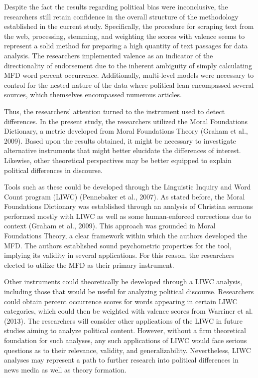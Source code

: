 \documentclass[english,,man]{apa6}
\begin{document}
Despite the fact the results regarding political bias were inconclusive, the researchers still retain confidence in the overall structure of the methodology established in the current study. Specifically, the procedure for scraping text from the web, processing, stemming, and weighting the scores with valence seems to represent a solid method for preparing a high quantity of text passages for data analysis. The researchers implemented valence as an indicator of the directionality of endorsement due to the inherent ambiguity of simply calculating MFD word percent occurrence. Additionally, multi-level models were necessary to control for the nested nature of the data where political lean encompassed several sources, which themselves encompassed numerous articles.

Thus, the researchers' attention turned to the instrument used to detect differences. In the present study, the researchers utilized the Moral Foundations Dictionary, a metric developed from Moral Foundations Theory (Graham et al., 2009). Based upon the results obtained, it might be necessary to investigate alternative instruments that might better elucidate the differences of interest. Likewise, other theoretical perspectives may be better equipped to explain political differences in discourse.

Tools such as these could be developed through the Linguistic Inquiry and Word Count program (LIWC) (Pennebaker et al., 2007). As stated before, the Moral Foundations Dictionary was established through an analysis of Christian sermons performed mostly with LIWC as well as some human-enforced corrections due to context (Graham et al., 2009). This approach was grounded in Moral Foundations Theory, a clear framework within which the authors developed the MFD. The authors established sound psychometric properties for the tool, implying its validity in several applications. For this reason, the researchers elected to utilize the MFD as their primary instrument.

Other instruments could theoretically be developed through a LIWC analysis, including those that would be useful for analyzing political discourse. Researchers could obtain percent occurrence scores for words appearing in certain LIWC categories, which could then be weighted with valence scores from Warriner et al. (2013). The researchers will consider other applications of the LIWC in future studies aiming to analyze political content. However, without a firm theoretical foundation for such analyses, any such applications of LIWC would face serious questions as to their relevance, validity, and generalizability. Nevertheless, LIWC analyses may represent a path to further research into political differences in news media as well as theory formation.
\end{document}
